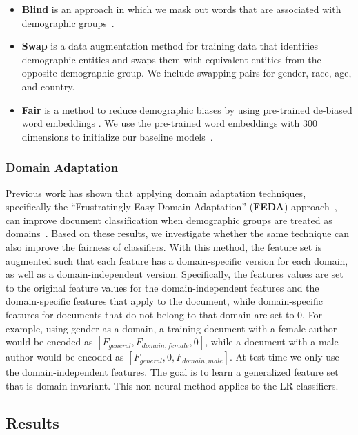 \begin{itemize}
    \item \textbf{Blind} is an approach in which we mask out words that are associated with demographic groups~\cite{garg2019counterfactual}.
    \item \textbf{Swap} is a data augmentation method for training data that identifies demographic entities and swaps them with equivalent entities from the opposite demographic group. We include swapping pairs for gender, race, age, and country.
    \item \textbf{Fair} is a method to reduce demographic biases by using pre-trained de-biased word embeddings . 
We use the pre-trained word embeddings with 300 dimensions to initialize our baseline models~\cite{bolukbasi2016man}.
\end{itemize}


\subsubsection{Domain Adaptation}

Previous work has shown that applying domain adaptation techniques, specifically the ``Frustratingly Easy Domain Adaptation'' (\textbf{FEDA}) approach~\cite{daume2007frustratingly},
can improve document classification when demographic groups are treated as domains~\cite{volkova2013exploring, lynn2017human}.
Based on these results, we investigate whether the same technique can also improve the fairness of classifiers.
With this method, the feature set is augmented such that each feature has a domain-specific version for each domain, as well as a domain-independent version.
Specifically, the features values are set to the original feature values for the domain-independent features and the domain-specific features that apply to the document, while domain-specific features for documents that do not belong to that domain are set to $0$.
For example, using gender as a domain, a training document with a female author would be encoded as $[F_{general}, F_{domain, female}, 0]$, while a document with a male author would be encoded as $[F_{general}, 0, F_{domain, male}]$.
At test time we only use the domain-independent features.
The goal is to learn a generalized feature set that is domain invariant.
This non-neural method applies to the LR classifiers.


\subsection{Results}

